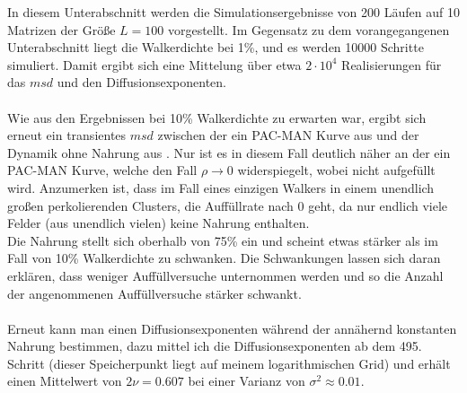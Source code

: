 \documentclass[a4paper, 12pt]{report}
\begin{document}
In diesem Unterabschnitt werden die Simulationsergebnisse von 200 Läufen auf 10 Matrizen der Größe $L=100$ vorgestellt. Im Gegensatz zu dem vorangegangenen Unterabschnitt liegt die Walkerdichte bei 1\%, und es werden 10000 Schritte simuliert. Damit ergibt sich eine Mittelung über etwa $2\cdot 10^4$ Realisierungen für das $msd$ und den Diffusionsexponenten.
\\
\\
Wie aus den Ergebnissen bei 10\% Walkerdichte zu erwarten war, ergibt sich erneut ein transientes $msd$ zwischen der ein PAC-MAN Kurve aus \cite{doi:10.1063/1.4999485} und der Dynamik ohne Nahrung aus \cite{PhysRevLett.50.77}. Nur ist es in diesem Fall deutlich näher an der ein PAC-MAN Kurve, welche den Fall $\rho \rightarrow 0$ widerspiegelt, wobei nicht aufgefüllt wird. Anzumerken ist, dass im Fall eines einzigen Walkers in einem unendlich großen perkolierenden Clusters, die Auffüllrate nach $0$ geht, da nur endlich viele Felder (aus unendlich vielen) keine Nahrung enthalten.
\\
Die Nahrung stellt sich oberhalb von 75\% ein und scheint etwas stärker als im Fall von 10\% Walkerdichte zu schwanken. Die Schwankungen lassen sich daran erklären, dass weniger Auffüllversuche unternommen werden und so die Anzahl der angenommenen Auffüllversuche stärker schwankt.
\\
\\
Erneut kann man einen Diffusionsexponenten während der annähernd konstanten Nahrung bestimmen, dazu mittel ich die Diffusionsexponenten ab dem 495. Schritt (dieser Speicherpunkt liegt auf meinem logarithmischen Grid) und erhält einen Mittelwert von $2\nu = 0.607$ bei einer Varianz von $\sigma^2 \approx 0.01 $.
\end{document}
